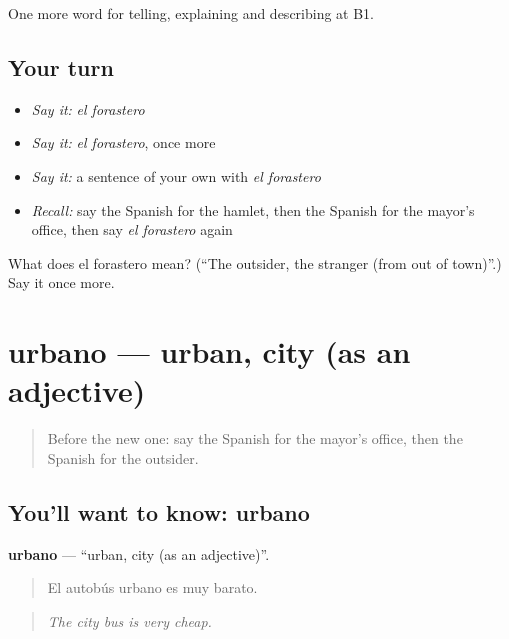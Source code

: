 \begin{grammarlens}[title={What you've built}]
One more word for telling, explaining and describing at B1.
\end{grammarlens}

\subsection*{Your turn}
\begin{itemize}
\raggedright
  \item \emph{Say it:} \emph{el forastero}
  \item \emph{Say it:} \emph{el forastero}, once more
  \item \emph{Say it:} a sentence of your own with \emph{el forastero}
  \item \emph{Recall:} say the Spanish for the hamlet, then the Spanish for the mayor’s office, then say \emph{el forastero} again
\end{itemize}

\begin{tcolorbox}[breakable,colback=teal!4,colframe=teal!35!black,title={Before you move on}]
What does el forastero mean? (\textquotedblleft{}The outsider, the stranger (from out of town)\textquotedblright{}.) Say it once more.
\end{tcolorbox}
\section[urbano]{urbano — urban, city (as an adjective)}

\label{lesson:ES-C684-urbano}



\begin{quote}
Before the new one: say the Spanish for the mayor’s office, then the Spanish for the outsider.
\end{quote}

\subsection*{You'll want to know: urbano}
\textbf{urbano} — \textquotedblleft{}urban, city (as an adjective)\textquotedblright{}.

\begin{quote}
El autobús urbano es muy barato.
\end{quote}

\begin{quote}
\emph{The city bus is very cheap.}
\end{quote}

